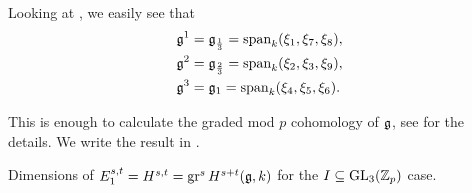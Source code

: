 Looking at , we easily see that
\begin{align*}
  \mathfrak{g}^{1} &= \mathfrak{g}_{\frac{1}{3}} = \operatorname{span}_{k}(\xi_{1},\xi_{7},\xi_{8}), \\
  \mathfrak{g}^{2} &= \mathfrak{g}_{\frac{2}{3}} = \operatorname{span}_{k}(\xi_{2},\xi_{3},\xi_{9}), \\
  \mathfrak{g}^{3} &= \mathfrak{g}_{1} = \operatorname{span}_{k}(\xi_{4},\xi_{5},\xi_{6}).
\end{align*}

This is enough to calculate the graded mod $p$ cohomology of $\mathfrak{g}$, see \cite{code} for the details. We write the result in .

\begin{table}[ht]
  \centering
  \caption[Graded cohomology dimensions for the $I \subseteq \GL_{3}(\Z_{p})$ case]{Dimensions of $E_{1}^{s,t} = H^{s,t} = \operatorname{gr}^{s} H^{s+t}(\mathfrak{g},k)$ for the $I \subseteq \GL_{3}(\Z_{p})$ case.}
  \label{tab:graded-coh-dims-GL3}
  \renewcommand{\arraystretch}{1.7}
  \renewcommand{\arraystretch}{1}
\end{table}

